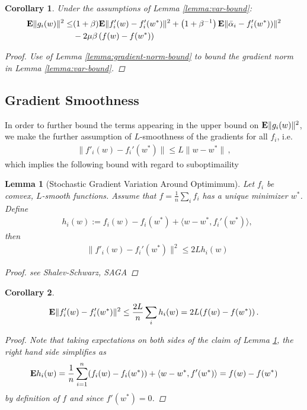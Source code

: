 \documentclass{article}
\newtheorem{lemma}{Lemma}
\newtheorem{corollary}{Corollary}
\newcommand{\E}{{\bf E}}
\begin{document}
\begin{corollary}
Under the assumptions of Lemma \ref{lemma:var-bound}:
\begin{align}
\E \|g_i(w)\|^2 \le & (1+\beta) \E \| f'_i(w) - f'_i(w^*) \|^2 + \left(1+ \beta^{-1} \right) \E \| \bar \alpha_i - f_i'(w^*) )\|^2 
\nonumber \\
& - 2 \mu \beta \left( f(w) - f(w^*) \right) 
\end{align}
\begin{proof}
Use of Lemma \ref{lemma:gradient-norm-bound} to bound the gradient norm in Lemma \ref{lemma:var-bound}.
\end{proof} 
\label{corollary:variance}
\end{corollary}

\subsection{Gradient Smoothness} 

In order to further bound the terms appearing in the upper bound on $\E \|g_i(w)\|^2$, we make the further assumption of $L$-smoothness of the gradients for all $f_i$, i.e.~ 
\begin{align}
\| f'_i(w) - f_i'(w^*) \| \le L\| w - w^*\| \,,
\end{align}
which implies the following bound with regard to suboptimaility 
\begin{lemma}[Stochastic Gradient Variation Around Optimimum]
Let $f_i$ be comvex, $L$-smooth functions. Assume that $f=\frac 1n \sum_i f_i$ has a unique minimizer $w^*$. 
Define 
\begin{align}
& h_i(w)  := f_i(w) - f_i(w^*)+  \langle w-w^*, f_i'(w^*) \rangle, 
\end{align}
then 
\begin{align}
& \| f'_i(w) - f_i'(w^*) \|^2 \le 2L h_i(w)
\end{align}
\label{lemma:stochastic-gradient-variation} 
\begin{proof} 
see Shalev-Schwarz, SAGA 
\end{proof}
\end{lemma}
%
\begin{corollary}
\begin{align}
\E \| f_i'(w) - f_i'(w^*)\|^2 \le \frac {2L }n \sum_i h_i(w) = 2L (f(w) - f(w^*))\,.
\label{eq:smoothness-suboptimaility-bound}
\end{align}
\begin{proof}
Note that  taking expectations on both sides of the claim of Lemma \ref{lemma:stochastic-gradient-variation}, the right hand side simplifies as 
\begin{align}
\E h_i(w)  = \frac 1n \sum_{i=1}^n (f_i(w) - f_i(w^*))+  \langle w-w^*, f'(w^*) \rangle = f(w) - f(w^*) 
\end{align}
by definition of $f$ and since $f'(w^*)=0$. 
\end{proof}
\label{cor:smoothness-suboptimaility-bound}
\end{corollary}
\end{document}
